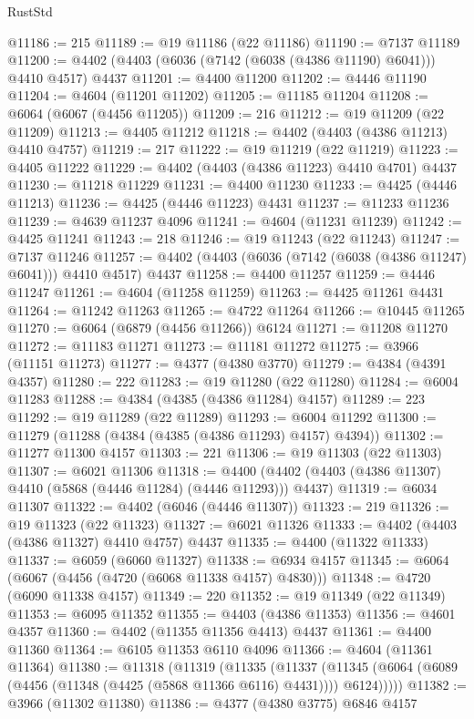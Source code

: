 \begin{lexlean}{RustStd}
\begin{coremodule}
@11186 := 215
@11189 := @19 @11186 (@22 @11186)
@11190 := @7137 @11189
@11200 := @4402 (@4403 (@6036 (@7142 (@6038 (@4386 @11190) @6041))) @4410 @4517) @4437
@11201 := @4400 @11200
@11202 := @4446 @11190
@11204 := @4604 (@11201 @11202)
@11205 := @11185 @11204
@11208 := @6064 (@6067 (@4456 @11205))
@11209 := 216
@11212 := @19 @11209 (@22 @11209)
@11213 := @4405 @11212
@11218 := @4402 (@4403 (@4386 @11213) @4410 @4757)
@11219 := 217
@11222 := @19 @11219 (@22 @11219)
@11223 := @4405 @11222
@11229 := @4402 (@4403 (@4386 @11223) @4410 @4701) @4437
@11230 := @11218 @11229
@11231 := @4400 @11230
@11233 := @4425 (@4446 @11213)
@11236 := @4425 (@4446 @11223) @4431
@11237 := @11233 @11236
@11239 := @4639 @11237 @4096
@11241 := @4604 (@11231 @11239)
@11242 := @4425 @11241
@11243 := 218
@11246 := @19 @11243 (@22 @11243)
@11247 := @7137 @11246
@11257 := @4402 (@4403 (@6036 (@7142 (@6038 (@4386 @11247) @6041))) @4410 @4517) @4437
@11258 := @4400 @11257
@11259 := @4446 @11247
@11261 := @4604 (@11258 @11259)
@11263 := @4425 @11261 @4431
@11264 := @11242 @11263
@11265 := @4722 @11264
@11266 := @10445 @11265
@11270 := @6064 (@6879 (@4456 @11266)) @6124
@11271 := @11208 @11270
@11272 := @11183 @11271
@11273 := @11181 @11272
@11275 := @3966 (@11151 @11273)
@11277 := @4377 (@4380 @3770)
@11279 := @4384 (@4391 @4357)
@11280 := 222
@11283 := @19 @11280 (@22 @11280)
@11284 := @6004 @11283
@11288 := @4384 (@4385 (@4386 @11284) @4157)
@11289 := 223
@11292 := @19 @11289 (@22 @11289)
@11293 := @6004 @11292
@11300 := @11279 (@11288 (@4384 (@4385 (@4386 @11293) @4157) @4394))
@11302 := @11277 @11300 @4157
@11303 := 221
@11306 := @19 @11303 (@22 @11303)
@11307 := @6021 @11306
@11318 := @4400 (@4402 (@4403 (@4386 @11307) @4410 (@5868 (@4446 @11284) (@4446 @11293))) @4437)
@11319 := @6034 @11307
@11322 := @4402 (@6046 (@4446 @11307))
@11323 := 219
@11326 := @19 @11323 (@22 @11323)
@11327 := @6021 @11326
@11333 := @4402 (@4403 (@4386 @11327) @4410 @4757) @4437
@11335 := @4400 (@11322 @11333)
@11337 := @6059 (@6060 @11327)
@11338 := @6934 @4157
@11345 := @6064 (@6067 (@4456 (@4720 (@6068 @11338 @4157) @4830)))
@11348 := @4720 (@6090 @11338 @4157)
@11349 := 220
@11352 := @19 @11349 (@22 @11349)
@11353 := @6095 @11352
@11355 := @4403 (@4386 @11353)
@11356 := @4601 @4357
@11360 := @4402 (@11355 @11356 @4413) @4437
@11361 := @4400 @11360
@11364 := @6105 @11353 @6110 @4096
@11366 := @4604 (@11361 @11364)
@11380 := @11318
    (@11319
      (@11335
        (@11337
          (@11345 (@6064 (@6089 (@4456 (@11348 (@4425 (@5868 @11366 @6116) @4431)))) @6124)))))
@11382 := @3966 (@11302 @11380)
@11386 := @4377 (@4380 @3775) @6846 @4157

\end{coremodule}
\end{lexlean}
